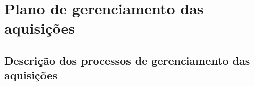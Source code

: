 
\chapter{Plano de gerenciamento das aquisições}

\section{Descrição dos processos de gerenciamento das aquisições}

